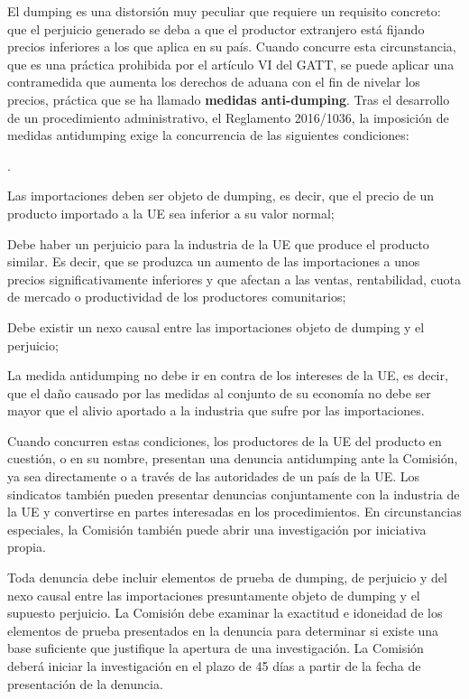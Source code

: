 \documentclass[10pt,a4paper]{article}
\newcounter{numitem}
\newenvironment{lnum}
      {\begin{list}{\arabic{numitem}.}{%
          \usecounter{numitem}%
          \setlength{\leftmargin}{1cm}%
          \setlength{\parskip}{3pt}%
          \setlength{\itemsep}{0pt}%
          \setlength{\parsep}{0pt}%
      }}
      {\end{list}}
\begin{document}
El dumping es una distorsión muy peculiar que requiere un requisito concreto: que el perjuicio generado se deba a que el productor extranjero está fijando precios inferiores a los que aplica en su país. Cuando concurre esta circunstancia, que es una práctica prohibida por el artículo VI del GATT, se puede aplicar una contramedida que aumenta los derechos de aduana con el fin de nivelar los precios, práctica que se ha llamado \textbf{medidas anti-dumping}. Tras el desarrollo de un procedimiento administrativo, el Reglamento 2016/1036, la imposición de medidas antidumping exige la concurrencia de las siguientes condiciones:
\begin{lnum}
    \item Las importaciones deben ser objeto de dumping, es decir, que el precio de un producto importado a la UE sea inferior a su valor normal;
    \item Debe haber un perjuicio para la industria de la UE que produce el producto similar. Es decir, que se produzca un aumento de las importaciones a unos precios significativamente inferiores y que afectan a las ventas, rentabilidad, cuota de mercado o productividad de los productores comunitarios;
    \item Debe existir un nexo causal entre las importaciones objeto de dumping y el perjuicio;
    \item La medida antidumping no debe ir en contra de los intereses de la UE, es decir, que el daño causado por las medidas al conjunto de su economía no debe ser mayor que el alivio aportado a la industria que sufre por las importaciones.
\end{lnum}

Cuando concurren estas condiciones, los productores de la UE del producto en cuestión, o en su nombre, presentan una denuncia antidumping ante la Comisión, ya sea directamente o a través de las autoridades de un país de la UE. Los sindicatos también pueden presentar denuncias conjuntamente con la industria de la UE y convertirse en partes interesadas en los procedimientos. En circunstancias especiales, la Comisión también puede abrir una investigación por iniciativa propia.

Toda denuncia debe incluir elementos de prueba de dumping, de perjuicio y del nexo causal entre las importaciones presuntamente objeto de dumping y el supuesto perjuicio. La Comisión debe examinar la exactitud e idoneidad de los elementos de prueba presentados en la denuncia para determinar si existe una base suficiente que justifique la apertura de una investigación. La Comisión deberá iniciar la investigación en el plazo de 45 días a partir de la fecha de presentación de la denuncia.
\end{document}
